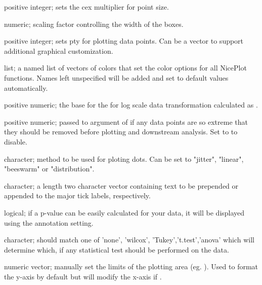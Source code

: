 \documentclass[a4paper]{book}
\begin{document}
\begin{Arguments}
\begin{ldescription}
\item[\code{pointSize}] positive integer; sets the cex multiplier for point size.

\item[\code{width}] numeric; scaling factor controlling the width of the boxes.

\item[\code{pointShape}] positive integer; sets pty for plotting data points. Can be a vector to support additional graphical customization.

\item[\code{plotColors}] list; a named list of vectors of colors that set the color options for all NicePlot functions. Names left unspecified will be added and set to default values automatically.

\item[\code{logScale}] positive numeric; the base for the for log scale data transformation calculated as .

\item[\code{trim}] positive numeric; passed to  argument of  if any data points are so extreme that they should be removed before plotting and downstream analysis. Set to  to disable.

\item[\code{pointMethod}] character; method to be used for ploting dots. Can be set to "jitter", "linear", "beeswarm" or "distribution".

\item[\code{axisText}] character; a length two character vector containing text to be prepended or appended to the major tick labels, respectively.

\item[\code{showCalc}] logical; if a p-value can be easily calculated for your data, it will be displayed using the  annotation setting.

\item[\code{calcType}] character; should match one of 'none', 'wilcox', 'Tukey','t.test','anova' which will determine which, if any statistical test should be performed on the data.

\item[\code{yLim}] numeric vector; manually set the limits of the plotting area (eg. ). Used to format the y-axis by default but will modify the x-axis if .


\end{ldescription}
\end{Arguments}
\end{document}
